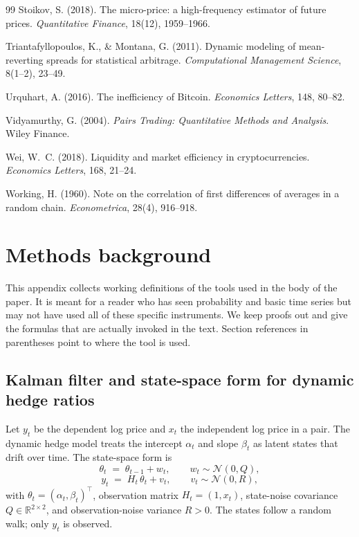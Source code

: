 \documentclass[11pt]{article}
\begin{document}
\begin{thebibliography}{99}
Stoikov, S. (2018). The micro-price: a high-frequency estimator of future prices.
\emph{Quantitative Finance}, 18(12), 1959--1966.

Triantafyllopoulos, K., \& Montana, G. (2011). Dynamic modeling of mean-reverting
spreads for statistical arbitrage. \emph{Computational Management Science}, 8(1--2), 23--49.

Urquhart, A. (2016). The inefficiency of Bitcoin. \emph{Economics Letters}, 148, 80--82.

Vidyamurthy, G. (2004). \emph{Pairs Trading: Quantitative Methods and Analysis}.
Wiley Finance.

Wei, W.~C. (2018). Liquidity and market efficiency in cryptocurrencies.
\emph{Economics Letters}, 168, 21--24.

Working, H. (1960). Note on the correlation of first differences of averages in a random
chain. \emph{Econometrica}, 28(4), 916--918.

\end{thebibliography}

\appendix

\section{Methods background}
\label{sec:appendix}

This appendix collects working definitions of the tools used in the body of the paper. It
is meant for a reader who has seen probability and basic time series but may not have used
all of these specific instruments. We keep proofs out and give the formulas that are
actually invoked in the text. Section references in parentheses point to where the tool is
used.

\subsection{Kalman filter and state-space form for dynamic hedge ratios}
\label{app:kalman}

Let $y_t$ be the dependent log price and $x_t$ the independent log price in a pair. The
dynamic hedge model treats the intercept $\alpha_t$ and slope $\beta_t$ as latent states
that drift over time. The state-space form is
\[
\theta_t \;=\; \theta_{t-1} + w_t, \qquad w_t \sim \mathcal{N}(0, Q),
\]
\[
y_t \;=\; H_t \, \theta_t + v_t, \qquad v_t \sim \mathcal{N}(0, R),
\]
with $\theta_t = (\alpha_t, \beta_t)^\top$, observation matrix $H_t = (1, x_t)$, state-noise
covariance $Q \in \mathbb{R}^{2\times 2}$, and observation-noise variance $R > 0$. The
states follow a random walk; only $y_t$ is observed.
\end{document}
